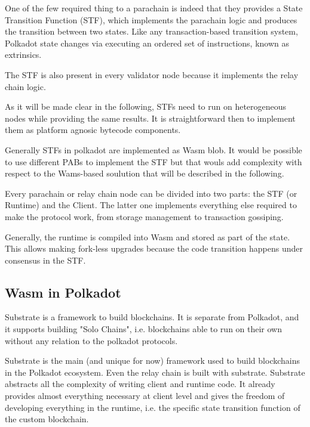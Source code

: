 \documentclass[../main.tex]{subfiles}
\begin{document}
One of the few required thing to a parachain is indeed that they provides a State Transition Function (STF), which implements the parachain logic and produces the transition between two states. Like any transaction-based transition system, Polkadot state changes via  executing an ordered set of instructions, known as extrinsics.~\cite{burdges2020overview}



The STF is also present in every validator node because it implements the relay chain logic. 


As it will be made clear in the following, STFs need to run on heterogeneous nodes while providing the same results. It is straightforward then to implement them as platform agnosic bytecode components.



Generally STFs in polkadot are implemented as Wasm blob. It would be possible to use different PABs to implement the STF but that wouls add complexity with respect to the Wams-based soulution that will be described in the following.

Every parachain or relay chain node can be divided into two parts: the STF (or Runtime) and the Client. The latter one implements everything else required to make the protocol work, from storage management to transaction gossiping.

Generally, the runtime is compiled into Wasm and stored as part of the state. This allows making fork-less upgrades because the code transition happens under consensus in the STF.



\subsection{Wasm in Polkadot}

Substrate is a framework to build blockchains. It is separate from Polkadot, and it supports building "Solo Chains", i.e.  blockchains able to run on their own without any relation to the polkadot protocols.

Substrate is the main (and unique for now) framework used to build blockchains in the Polkadot ecosystem. Even the relay chain is built with substrate. 
Substrate abstracts all the complexity of writing client and runtime code. It  already provides almost everything necessary at client level and gives the freedom of developing everything in the runtime, i.e. the specific state transition function of the custom blockchain.
\end{document}
